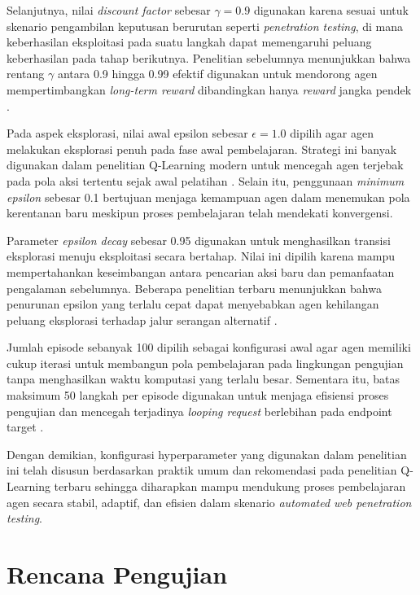 Selanjutnya, nilai \textit{discount factor} sebesar $\gamma = 0.9$ digunakan karena sesuai untuk skenario pengambilan keputusan berurutan seperti \textit{penetration testing}, di mana keberhasilan eksploitasi pada suatu langkah dapat memengaruhi peluang keberhasilan pada tahap berikutnya. Penelitian sebelumnya menunjukkan bahwa rentang $\gamma$ antara 0.9 hingga 0.99 efektif digunakan untuk mendorong agen mempertimbangkan \textit{long-term reward} dibandingkan hanya \textit{reward} jangka pendek \cite{liu2024hrl,yi2023drl}.

Pada aspek eksplorasi, nilai awal epsilon sebesar $\epsilon = 1.0$ dipilih agar agen melakukan eksplorasi penuh pada fase awal pembelajaran. Strategi ini banyak digunakan dalam penelitian Q-Learning modern untuk mencegah agen terjebak pada pola aksi tertentu sejak awal pelatihan \cite{becker2024evaluation,sensors2025rlpentest}. Selain itu, penggunaan \textit{minimum epsilon} sebesar 0.1 bertujuan menjaga kemampuan agen dalam menemukan pola kerentanan baru meskipun proses pembelajaran telah mendekati konvergensi.

Parameter \textit{epsilon decay} sebesar 0.95 digunakan untuk menghasilkan transisi eksplorasi menuju eksploitasi secara bertahap. Nilai ini dipilih karena mampu mempertahankan keseimbangan antara pencarian aksi baru dan pemanfaatan pengalaman sebelumnya. Beberapa penelitian terbaru menunjukkan bahwa penurunan epsilon yang terlalu cepat dapat menyebabkan agen kehilangan peluang eksplorasi terhadap jalur serangan alternatif \cite{sensors2025rlpentest,becker2024evaluation}.

Jumlah episode sebanyak 100 dipilih sebagai konfigurasi awal agar agen memiliki cukup iterasi untuk membangun pola pembelajaran pada lingkungan pengujian tanpa menghasilkan waktu komputasi yang terlalu besar. Sementara itu, batas maksimum 50 langkah per episode digunakan untuk menjaga efisiensi proses pengujian dan mencegah terjadinya \textit{looping request} berlebihan pada endpoint target \cite{ghanem2023hrl,yi2023drl}.

Dengan demikian, konfigurasi hyperparameter yang digunakan dalam penelitian ini telah disusun berdasarkan praktik umum dan rekomendasi pada penelitian Q-Learning terbaru sehingga diharapkan mampu mendukung proses pembelajaran agen secara stabil, adaptif, dan efisien dalam skenario \textit{automated web penetration testing}.

\section{Rencana Pengujian}

